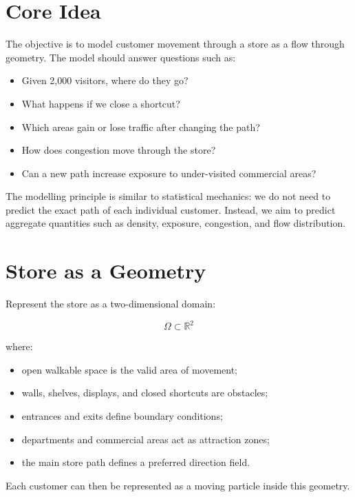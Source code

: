 \documentclass[11pt,a4paper]{article}
\begin{document}
\section{Core Idea}

The objective is to model customer movement through a store as a flow through geometry. The model should answer questions such as:

\begin{itemize}[leftmargin=*]
    \item Given 2,000 visitors, where do they go?
    \item What happens if we close a shortcut?
    \item Which areas gain or lose traffic after changing the path?
    \item How does congestion move through the store?
    \item Can a new path increase exposure to under-visited commercial areas?
\end{itemize}

The modelling principle is similar to statistical mechanics: we do not need to predict the exact path of each individual customer. Instead, we aim to predict aggregate quantities such as density, exposure, congestion, and flow distribution.

\section{Store as a Geometry}

Represent the store as a two-dimensional domain:

\begin{equation}
\Omega \subset \mathbb{R}^2
\end{equation}

where:

\begin{itemize}[leftmargin=*]
    \item open walkable space is the valid area of movement;
    \item walls, shelves, displays, and closed shortcuts are obstacles;
    \item entrances and exits define boundary conditions;
    \item departments and commercial areas act as attraction zones;
    \item the main store path defines a preferred direction field.
\end{itemize}

Each customer can then be represented as a moving particle inside this geometry.
\end{document}
